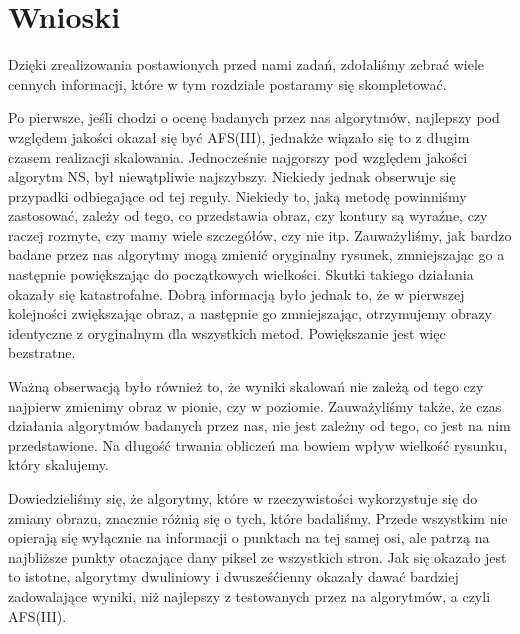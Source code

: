 \section{Wnioski}
Dzięki zrealizowania postawionych przed nami zadań, zdołaliśmy zebrać wiele
cennych informacji, które w tym rozdziale postaramy się skompletować.

Po pierwsze, jeśli chodzi o ocenę badanych przez nas algorytmów, najlepszy
pod względem jakości okazał się być AFS(III), jednakże wiązało się to z długim czasem
realizacji skalowania. Jednocześnie najgorszy pod względem jakości algorytm NS,
był niewątpliwie najszybszy. Niekiedy jednak obserwuje się przypadki odbiegające od tej reguły.
Niekiedy to, jaką metodę powinniśmy zastosować, zależy od tego, co przedstawia obraz,
czy kontury są wyraźne, czy raczej rozmyte, czy mamy wiele szczegółów, czy nie itp. 
Zauważyliśmy, jak bardzo badane przez nas algorytmy mogą zmienić
oryginalny rysunek, zmniejszając go a następnie powiększając do początkowych wielkości. 
Skutki takiego działania okazały się katastrofalne.
Dobrą informacją było jednak to, że w pierwszej kolejności zwiększając obraz, a następnie
go zmniejszając, otrzymujemy obrazy identyczne z oryginalnym dla wszystkich metod.
Powiększanie jest więc bezstratne.

Ważną obserwacją było również to, że wyniki skalowań nie zależą od tego czy
najpierw zmienimy obraz w pionie, czy w poziomie. Zauważyliśmy także, że czas
działania algorytmów badanych przez nas, nie jest zależny od tego, co jest
na nim przedstawione. Na długość trwania obliczeń ma bowiem wpływ wielkość rysunku, który skalujemy.

Dowiedzieliśmy się, że algorytmy, które w rzeczywistości wykorzystuje się do zmiany obrazu, 
znacznie różnią się o tych, które badaliśmy. Przede wszystkim nie opierają się wyłącznie na 
informacji o punktach na tej samej osi, ale patrzą na najbliższe punkty otaczające dany piksel ze wszystkich stron.
Jak się okazało jest to istotne, algorytmy dwuliniowy i dwusześćienny okazały dawać bardziej zadowalające 
wyniki, niż najlepszy z testowanych przez na algorytmów, a czyli AFS(III).
